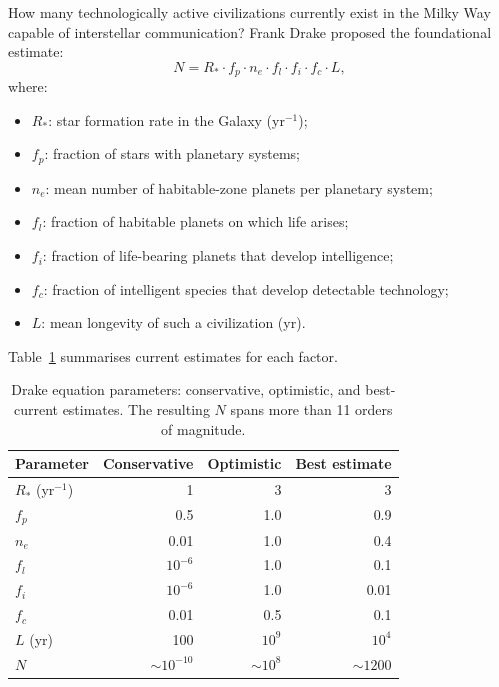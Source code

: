 \documentclass[12pt,a4paper]{article}
\begin{document}
How many technologically active civilizations currently exist in the Milky Way
capable of interstellar communication? Frank Drake \citep{Drake1961} proposed
the foundational estimate:
\begin{equation}
  \boxed{N = R_* \cdot f_p \cdot n_e \cdot f_l \cdot f_i \cdot f_c \cdot L,}
  \label{eq:drake}
\end{equation}
where:
\begin{itemize}[noitemsep]
  \item $R_*$: star formation rate in the Galaxy (yr$^{-1}$);
  \item $f_p$: fraction of stars with planetary systems;
  \item $n_e$: mean number of habitable-zone planets per planetary system;
  \item $f_l$: fraction of habitable planets on which life arises;
  \item $f_i$: fraction of life-bearing planets that develop intelligence;
  \item $f_c$: fraction of intelligent species that develop detectable
               technology;
  \item $L$: mean longevity of such a civilization (yr).
\end{itemize}

Table~\ref{tab:drake} summarises current estimates for each factor.

\begin{table}[ht]
  \centering
  \caption{Drake equation parameters: conservative, optimistic, and best-current
    estimates. The resulting $N$ spans more than 11 orders of magnitude.}
  \label{tab:drake}
  \begin{tabularx}{\textwidth}{X r r r}
    \toprule
    Parameter & Conservative & Optimistic & Best estimate \\
    \midrule
    $R_*$ (yr$^{-1}$) & 1    & 3          & 3    \\
    $f_p$              & 0.5  & 1.0        & 0.9  \\
    $n_e$              & 0.01 & 1.0        & 0.4  \\
    $f_l$              & $10^{-6}$ & 1.0  & 0.1  \\
    $f_i$              & $10^{-6}$ & 1.0  & 0.01 \\
    $f_c$              & 0.01 & 0.5        & 0.1  \\
    $L$ (yr)           & 100  & $10^9$     & $10^4$ \\
    \midrule
    $N$       & $\sim 10^{-10}$ & $\sim 10^8$ & $\sim 1200$ \\
    \bottomrule
  \end{tabularx}
\end{table}
\end{document}
